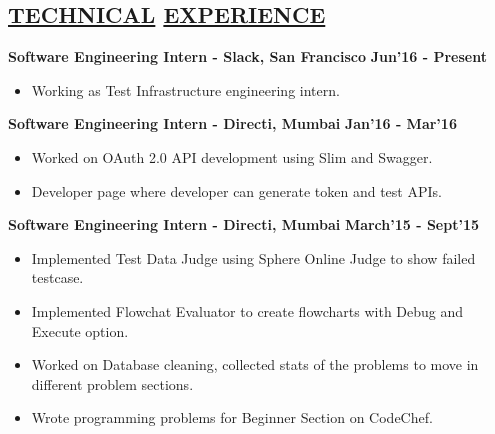 \documentclass[margin]{res}
\begin{document}
\begin{resume}
\section{\underline{TECHNICAL}
\underline{EXPERIENCE}}
\textbf{Software Engineering Intern - Slack, San Francisco} \hfill
\textbf{Jun'16 - Present}\\
\vspace{-4mm}
\begin{itemize}
\setlength{\itemsep}{0pt}
\item Working as Test Infrastructure engineering intern.
\end{itemize}
\vspace{-4mm}
\textbf{Software Engineering Intern - Directi, Mumbai} \hfill
\textbf{Jan'16 - Mar'16}\\
\vspace{-4mm}
\begin{itemize}
\setlength{\itemsep}{0pt}
\item Worked on OAuth 2.0 API development using Slim and Swagger.
\item Developer page where developer can generate token and test APIs.
\end{itemize}
\vspace{-4mm}
\textbf{Software Engineering Intern - Directi, Mumbai} \hfill \textbf{March'15 - Sept'15}
\begin{itemize}
\setlength{\itemsep}{0pt}
\item Implemented Test Data Judge using Sphere Online Judge to show failed testcase.
\item Implemented Flowchat Evaluator to create flowcharts with Debug and Execute option.
\item Worked on Database cleaning, collected stats of the problems to move in different problem sections.
\item Wrote programming problems for Beginner Section on CodeChef. 
\end{itemize}
\vspace{-5mm}

\end{resume}
\end{document}
